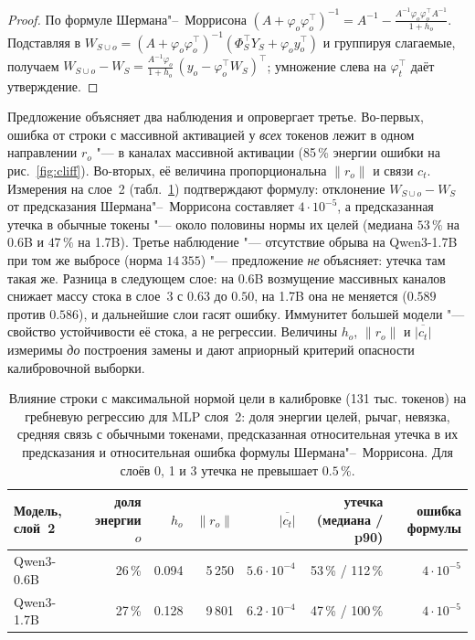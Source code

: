 \begin{proof}
По формуле Шермана"--~Моррисона $(A + \varphi_o\varphi_o^\top)^{-1} =
A^{-1} - \frac{A^{-1}\varphi_o\varphi_o^\top A^{-1}}{1 + h_o}$. Подставляя в
$W_{S\cup o} = (A + \varphi_o\varphi_o^\top)^{-1}(\Phi_S^\top Y_S +
\varphi_o y_o^\top)$ и группируя слагаемые, получаем
$W_{S\cup o} - W_S = \frac{A^{-1}\varphi_o}{1+h_o}\,(y_o -
\varphi_o^\top W_S)^\top$; умножение слева на $\varphi_t^\top$ даёт
утверждение.
\end{proof}

Предложение объясняет два наблюдения и опровергает третье. Во-первых,
ошибка от строки с массивной активацией у \emph{всех} токенов лежит в
одном направлении $r_o$ "--- в каналах массивной активации (85\,\%
энергии ошибки на рис.~\ref{fig:cliff}). Во-вторых, её величина
пропорциональна $\|r_o\|$ и связи $c_t$. Измерения на слое~2
(табл.~\ref{tab:leverage}) подтверждают формулу: отклонение
$W_{S\cup o}-W_S$ от предсказания Шермана"--~Моррисона составляет
$4\cdot10^{-5}$, а предсказанная утечка в обычные токены "--- около половины
нормы их целей (медиана $53\,\%$ на 0.6B и $47\,\%$ на 1.7B). Третье
наблюдение "--- отсутствие обрыва на Qwen3-1.7B при том же выбросе
(норма $14\,355$) "--- предложение \emph{не} объясняет: утечка там такая же.
Разница в следующем слое: на 0.6B возмущение массивных каналов снижает
массу стока в слое~3 с $0.63$ до $0.50$, на 1.7B она не меняется
($0.589$ против $0.586$), и дальнейшие слои гасят ошибку. Иммунитет
большей модели "--- свойство устойчивости её стока, а не регрессии.
Величины $h_o$, $\|r_o\|$ и $\overline{|c_t|}$ измеримы \emph{до}
построения замены и дают априорный критерий опасности калибровочной
выборки.

\begin{table}[t]
\centering
\scriptsize
\setlength{\tabcolsep}{4pt}
\begin{tabular}{lrrrrrr}
\toprule
Модель, слой~2 & доля энергии $o$ & $h_o$ & $\|r_o\|$ & $\overline{|c_t|}$ & утечка (медиана / p90) & ошибка формулы \\
\midrule
Qwen3-0.6B & 26\,\% & 0.094 & 5\,250 & $5.6\cdot10^{-4}$ & 53\,\% / 112\,\% & $4\cdot10^{-5}$ \\
Qwen3-1.7B & 27\,\% & 0.128 & 9\,801 & $6.2\cdot10^{-4}$ & 47\,\% / 100\,\% & $4\cdot10^{-5}$ \\
\bottomrule
\end{tabular}
\caption{Влияние строки с максимальной нормой цели в калибровке (131 тыс.
токенов) на гребневую регрессию для MLP слоя~2: доля энергии целей, рычаг,
невязка, средняя связь с обычными токенами, предсказанная относительная
утечка в их предсказания и относительная ошибка формулы
Шермана"--~Моррисона. Для слоёв 0, 1 и 3 утечка не превышает $0.5\,\%$.}
\label{tab:leverage}
\end{table}

